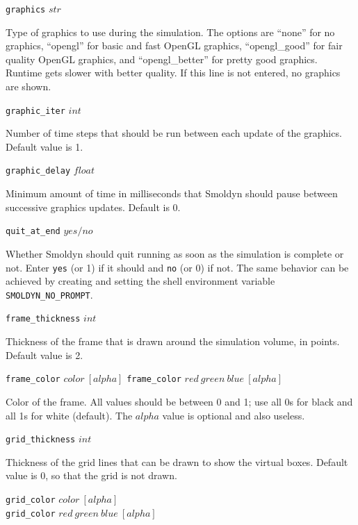 \documentclass {book}
\newcommand {\ttt} {\texttt}
\begin{document}
\begin{description}

\item{\ttt{graphics} $str$}

Type of graphics to use during the simulation. The options are ``none'' for no graphics, ``opengl'' for basic and fast OpenGL graphics, ``opengl\_good'' for fair quality OpenGL graphics, and ``opengl\_better'' for pretty good graphics. Runtime gets slower with better quality. If this line is not entered, no graphics are shown.

\item{\ttt{graphic\_iter} $int$}

Number of time steps that should be run between each update of the graphics. Default value is 1.

\item{\ttt{graphic\_delay} $float$}

Minimum amount of time in milliseconds that Smoldyn should pause between successive graphics updates. Default is 0.

\item{\ttt{quit\_at\_end} $yes/no$}

Whether Smoldyn should quit running as soon as the simulation is complete or not. Enter \ttt{yes} (or 1) if it should and \ttt{no} (or 0) if not. The same behavior can be achieved by creating and setting the shell environment variable \ttt{SMOLDYN\_NO\_PROMPT}.

\item{\ttt{frame\_thickness} $int$}

Thickness of the frame that is drawn around the simulation volume, in points. Default value is 2.

\item{\ttt{frame\_color} $color\ [alpha]$
\ttt{frame\_color} $red\ green\ blue\ [alpha]$}

Color of the frame. All values should be between 0 and 1; use all 0s for black and all 1s for white (default). The $alpha$ value is optional and also useless.

\item{\ttt{grid\_thickness} $int$}

Thickness of the grid lines that can be drawn to show the virtual boxes. Default value is 0, so that the grid is not drawn.

\item{\ttt{grid\_color} $color\ [alpha]$\\
\ttt{grid\_color} $red\ green\ blue\ [alpha]$}


\end{description}
\end{document}
